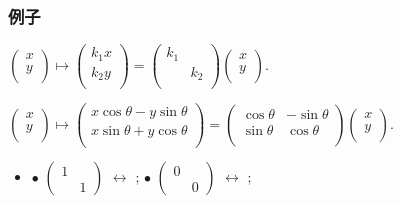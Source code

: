 \begin{frame}\frametitle{例子}

\begin{example}[伸缩变换]
$\begin{pmatrix} x\\y\\\end{pmatrix}\mapsto \begin{pmatrix} k_1x\\k_2y\\\end{pmatrix} = \begin{pmatrix} k_1&\\&k_2\\\end{pmatrix}\begin{pmatrix} x\\y\\\end{pmatrix}$.
\end{example}
\pp
\begin{example}[旋转变换]
$\begin{pmatrix} x\\y\\\end{pmatrix}\mapsto \begin{pmatrix} x\cos\theta-y\sin\theta\\x\sin\theta+y\cos\theta\\\end{pmatrix} = \begin{pmatrix} \cos\theta&-\sin\theta\\\sin\theta&\cos\theta\\\end{pmatrix}\begin{pmatrix} x\\y\\\end{pmatrix}$.
\end{example}
\pp
\begin{example}
\begin{itemize}
\item[] $\bullet$ $\begin{pmatrix}1&\\&1\end{pmatrix}$ $\leftrightarrow$ ;
\pp
\qquad $\bullet$ $\begin{pmatrix}0&\\&0\end{pmatrix}$ $\leftrightarrow$ ;

\end{itemize}
\end{example}
\end{frame}
